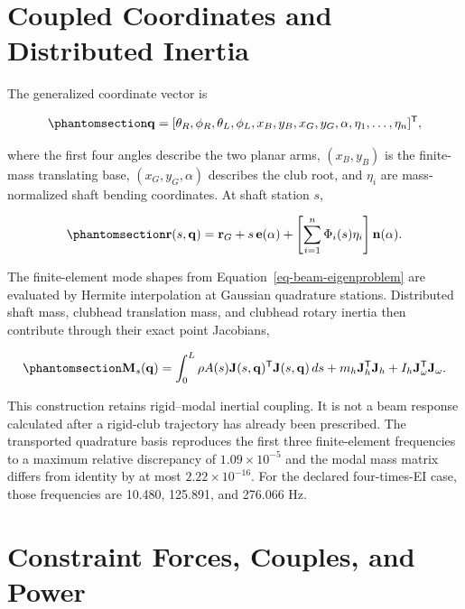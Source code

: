 \documentclass[
  letterpaper,
]{report}
\begin{document}
\section{Coupled Coordinates and Distributed
Inertia}\label{coupled-coordinates-and-distributed-inertia}

The generalized coordinate vector is

\begin{equation}\phantomsection\label{eq-modal-shaft-coordinates}{
\mathbf q=
[\theta_R,\phi_R,\theta_L,\phi_L,x_B,y_B,x_G,y_G,\alpha,
\eta_1,\ldots,\eta_n]^\mathsf T,
}\end{equation}

where the first four angles describe the two planar arms, \((x_B,y_B)\)
is the finite-mass translating base, \((x_G,y_G,\alpha)\) describes the
club root, and \(\eta_i\) are mass-normalized shaft bending coordinates.
At shaft station \(s\),

\begin{equation}\phantomsection\label{eq-modal-shaft-centerline}{
\mathbf r(s,\mathbf q)=\mathbf r_G+s\,\mathbf e(\alpha)
+\left[\sum_{i=1}^{n}\Phi_i(s)\eta_i\right]\mathbf n(\alpha).
}\end{equation}

The finite-element mode shapes from Equation~\ref{eq-beam-eigenproblem}
are evaluated by Hermite interpolation at Gaussian quadrature stations.
Distributed shaft mass, clubhead translation mass, and clubhead rotary
inertia then contribute through their exact point Jacobians,

\begin{equation}\phantomsection\label{eq-modal-shaft-distributed-mass}{
\mathbf M_s(\mathbf q)=
\int_0^L \rho A(s)\mathbf J(s,\mathbf q)^\mathsf T
\mathbf J(s,\mathbf q)\,ds
+m_h\mathbf J_h^\mathsf T\mathbf J_h
+I_h\mathbf J_\omega^\mathsf T\mathbf J_\omega.
}\end{equation}

This construction retains rigid--modal inertial coupling. It is not a
beam response calculated after a rigid-club trajectory has already been
prescribed. The transported quadrature basis reproduces the first three
finite-element frequencies to a maximum relative discrepancy of
\(1.09\times10^{-5}\) and the modal mass matrix differs from identity by
at most \(2.22\times10^{-16}\). For the declared four-times-EI case,
those frequencies are 10.480, 125.891, and 276.066 Hz.

\section{Constraint Forces, Couples, and
Power}\label{constraint-forces-couples-and-power}
\end{document}

